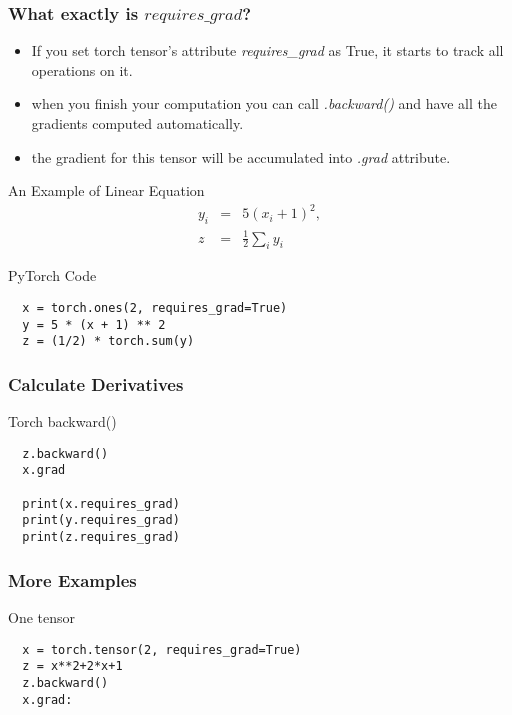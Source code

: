 \documentclass[14 pt]{beamer}
\let\olditem\item
\renewcommand{\item}{\olditem\vspace{4pt}}
\begin{document}
\begin{frame}
  \frametitle{What exactly is $requires\_grad$?}
  \begin{itemize}
  \item If you set torch tensor's attribute \emph{requires\_grad} as True,
    it starts to track all operations on it.
  \item when you finish your computation you can call \emph{.backward()}
    and have all the gradients computed automatically.
  \item the gradient for this tensor will be accumulated into \emph{.grad} attribute.
  \end{itemize}
\end{frame}

  \begin{frame}[fragile]{An Example of Linear Equation}
  \begin{displaymath}
    \begin{array}{lll}
          y_i & = &  5(x_i + 1)^2 , \\ 
          z & = & \frac{1}{2}\sum_i y_i
    \end{array}
  \end{displaymath}
    \begin{block}{PyTorch Code}
\begin{verbatim}
  x = torch.ones(2, requires_grad=True)
  y = 5 * (x + 1) ** 2
  z = (1/2) * torch.sum(y)
\end{verbatim}
    \end{block}
  \end{frame}

  \begin{frame}[fragile]
    \frametitle{Calculate Derivatives}
    \begin{block}{Torch backward()}
\begin{verbatim}
  z.backward()
  x.grad

  print(x.requires_grad)
  print(y.requires_grad)
  print(z.requires_grad)
\end{verbatim}
    \end{block}
  \end{frame}

\begin{frame}[fragile]
  \frametitle{More Examples }
  \begin{block}{One tensor}
\begin{verbatim}
  x = torch.tensor(2, requires_grad=True) 
  z = x**2+2*x+1 
  z.backward() 
  x.grad:
\end{verbatim}
  \end{block}
\end{frame}
\end{document}
